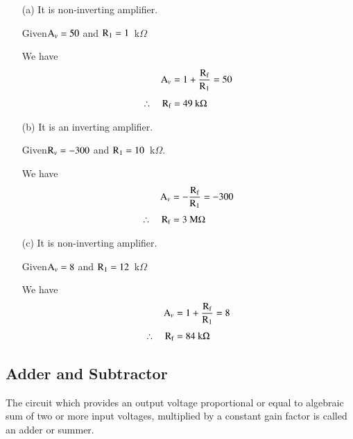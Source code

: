 \begin{solution}
\begin{itemize}
\item[(a)] It is non-inverting amplifier.

Given\quad $\textrm{A}_{v}=50$ and $\textrm{R}_{1}=1$~k$\Omega$

We have
\begin{align*}
\textrm{A}_{v} &= 1+\frac{\textrm{R}_{\textrm{f}}}{\textrm{R}_{1}}=50\\[4pt]
\therefore\quad \textrm{R}_{\textrm{f}} &= 49\text{~k}\Omega
\end{align*}

\eject

\item[(b)] It is an inverting amplifier.

Given\quad $\textrm{R}_{v}=-300$ and $\textrm{R}_{1}=10$~k$\Omega$.

We have
\begin{align*}
\textrm{A}_{v} &= -\frac{\textrm{R}_{\textrm{f}}}{\textrm{R}_{1}}=-300\\[3pt]
\therefore\quad \textrm{R}_{\textrm{f}} &= 3\text{~M}\Omega
\end{align*}

\item[(c)] It is non-inverting amplifier.

Given\quad $\textrm{A}_{v}=8$ and $\textrm{R}_{1}=12$~k$\Omega$

We have
\begin{align*}
\textrm{A}_{v} &= 1+\frac{\textrm{R}_{\textrm{f}}}{\textrm{R}_{1}}=8\\[3pt]
\therefore\quad \textrm{R}_{\textrm{f}} &= 84\text{~k}\Omega
\end{align*}
\end{itemize}
\end{solution}

\subsection{Adder and Subtractor}

The circuit which provides an output voltage proportional or equal to algebraic sum of two or more input voltages, multiplied by a constant gain factor is called an adder or summer.

